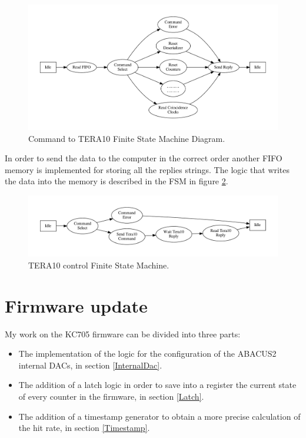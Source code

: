 \begin{figure}[H]
	\centering
	\includegraphics[width=1.0\linewidth]{FSMdiagrams/CMDtoTERA10.pdf}
	\caption{Command to TERA10 Finite State Machine Diagram.}
	\label{fig:fsmFIFO1}
\end{figure}
\noindent In order to send the data to the computer in the correct order another FIFO memory is implemented for storing all the replies strings.
The logic that writes the data into the memory is described in the FSM in figure \ref{fig:fsmFIFO2}.
\begin{figure}[H]
	\centering
	\includegraphics[width=1.0\linewidth]{FSMdiagrams/TERA10controll.pdf}
	\caption{TERA10 control Finite State Machine.}
	\label{fig:fsmFIFO2}
\end{figure}  

\section{Firmware update}
My work on the KC705 firmware can be divided into three parts:
\begin{itemize}
	\item The implementation of the logic for the configuration of the ABACUS2 internal DACs, in section \ref{InternalDac}. 
	\item The addition of a latch logic in order to save into a register the current state of every counter in the firmware, in section \ref{Latch}.
	\item The addition of a timestamp generator to obtain a more precise calculation of the hit rate, in section \ref{Timestamp}. 
\end{itemize}

